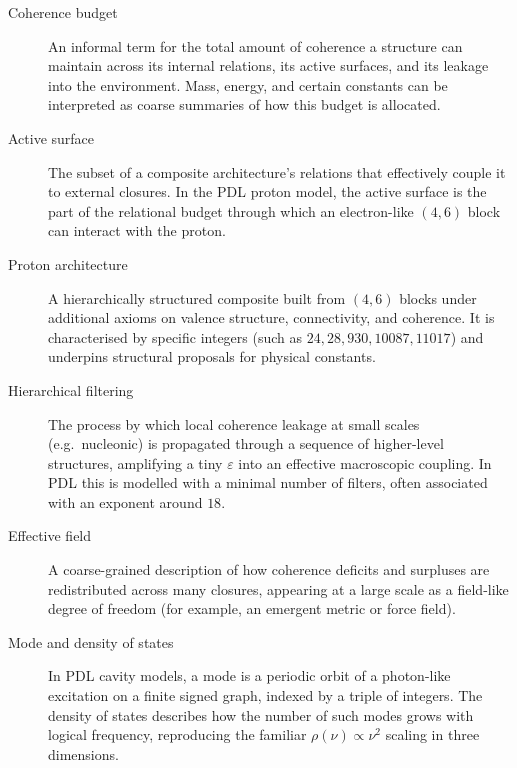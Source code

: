 \documentclass[11pt,a4paper]{article}
\theoremstyle{definition}
\begin{document}
\begin{description}
\item[Coherence budget]
An informal term for the total amount of coherence a structure can maintain across its internal relations, its active surfaces, and its leakage into the environment. Mass, energy, and certain constants can be interpreted as coarse summaries of how this budget is allocated.\cite{Laubscher_EmergencePhysicalReality_2024,Laubscher_Alpha_v2_2024,Laubscher_Existence_PulsatingClosure_2026}

\item[Active surface]
The subset of a composite architecture’s relations that effectively couple it to external closures. In the PDL proton model, the active surface is the part of the relational budget through which an electron-like $(4,6)$ block can interact with the proton.\cite{Laubscher_ProtonArch_v2_2024,Laubscher_Born_Golden_v2_2024}

\item[Proton architecture]
A hierarchically structured composite built from $(4,6)$ blocks under additional axioms on valence structure, connectivity, and coherence. It is characterised by specific integers (such as $24,28,930,10087,11017$) and underpins structural proposals for physical constants.\cite{Laubscher_ProtonArch_v2_2024,Laubscher_PDL_GlobalMapping_v6_2024}

\item[Hierarchical filtering]
The process by which local coherence leakage at small scales (e.g.\ nucleonic) is propagated through a sequence of higher-level structures, amplifying a tiny $\varepsilon$ into an effective macroscopic coupling. In PDL this is modelled with a minimal number of filters, often associated with an exponent around $18$.\cite{Laubscher_Exponent18_v2_2024,Laubscher_UniversalCoherenceLeakage_2024}

\item[Effective field]
A coarse-grained description of how coherence deficits and surpluses are redistributed across many closures, appearing at a large scale as a field-like degree of freedom (for example, an emergent metric or force field).\cite{Laubscher_EffectiveFields_2024}

\item[Mode and density of states]
In PDL cavity models, a mode is a periodic orbit of a photon-like excitation on a finite signed graph, indexed by a triple of integers. The density of states describes how the number of such modes grows with logical frequency, reproducing the familiar $\rho(\nu)\propto \nu^2$ scaling in three dimensions.\cite{Laubscher_CavityModes_PDL_2024}


\end{description}
\end{document}
